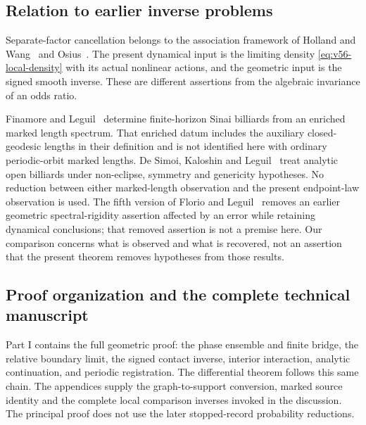 \subsection{Relation to earlier inverse problems}

Separate-factor cancellation belongs to the association framework of
Holland and Wang~\cite{HollandWang1987} and Osius~\cite{Osius2009}.
The present dynamical input is the limiting density
\eqref{eq:v56-local-density} with its actual nonlinear actions, and the
geometric input is the signed smooth inverse.  These are different
assertions from the algebraic invariance of an odds ratio.

Finamore and Leguil~\cite{FinamoreLeguil} determine finite-horizon Sinai
billiards from an enriched marked length spectrum.  That enriched datum
includes the auxiliary closed-geodesic lengths in their definition and
is not identified here with ordinary periodic-orbit marked lengths.
De Simoi, Kaloshin and Leguil~\cite{DSKL} treat analytic open billiards
under non-eclipse, symmetry and genericity hypotheses.  No reduction
between either marked-length observation and the present endpoint-law
observation is used.  The fifth version of Florio and
Leguil~\cite{FlorioLeguil} removes an earlier geometric spectral-rigidity
assertion affected by an error while retaining dynamical conclusions;
that removed assertion is not a premise here.  Our comparison concerns
what is observed and what is recovered, not an assertion that the present
theorem removes hypotheses from those results.

\subsection{Proof organization and the complete technical manuscript}

Part I contains the full geometric proof: the phase ensemble and finite
bridge, the relative boundary limit, the signed contact inverse,
interior interaction, analytic continuation, and periodic registration.
The differential theorem follows this same chain.  The appendices supply
the graph-to-support conversion, marked source identity and the complete
local comparison inverses invoked in the discussion.  The principal
proof does not use the later stopped-record probability reductions.

